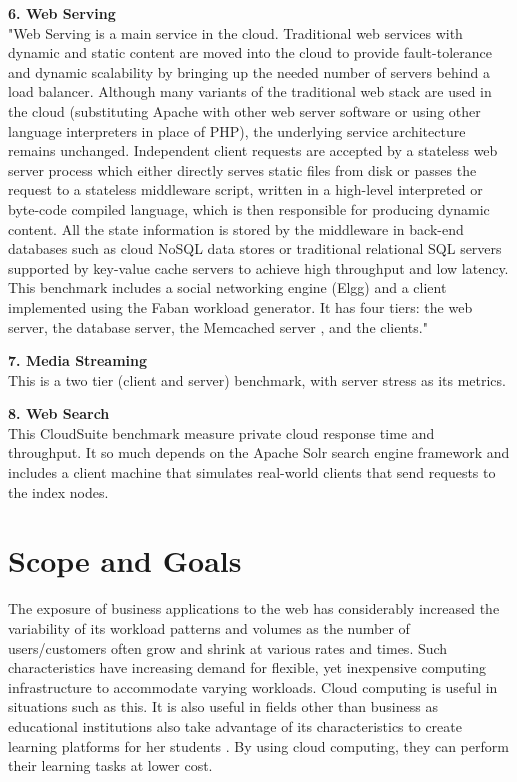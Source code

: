 \textbf{6. Web Serving} \\
"Web Serving is a main service in the cloud. Traditional web services with dynamic and static content are moved into the cloud to provide fault-tolerance and dynamic scalability by bringing up the needed number of servers behind a load balancer. Although many variants of the traditional web stack are used in the cloud (substituting Apache with other web server software or using other language interpreters in place of PHP), the underlying service architecture remains unchanged. Independent client requests are accepted by a stateless web server process which either directly serves static files from disk or passes the request to a stateless middleware script, written in a high-level interpreted or byte-code compiled language, which is then responsible for producing dynamic content. All the state information is stored by the middleware in back-end databases such as cloud NoSQL data stores or traditional relational SQL servers supported by key-value cache servers to achieve high throughput and low latency. This benchmark includes a social networking engine (Elgg) and a client implemented using the Faban workload generator. It has four tiers: the web server, the database server, the Memcached server \cite{memcached}, and the clients." \cite{CloudSuite_WebServing}

\textbf{7. Media Streaming} \\
This is a two tier (client and server) benchmark, with server stress as its metrics.

\textbf{8. Web Search}\\
This CloudSuite benchmark measure private cloud response time and throughput. It so much depends on the Apache Solr \cite{apachesoir2018} search engine framework and includes a client machine that simulates real-world clients that send requests to the index nodes.

\section{Scope and Goals}
The exposure of business applications to the web has considerably increased the variability of its workload patterns and volumes as the number of users/customers often grow and shrink at various rates and times. Such characteristics have increasing demand for flexible, yet inexpensive computing infrastructure to accommodate varying workloads. Cloud computing is useful in situations such as this. It is also useful in fields other than business as educational institutions also take advantage of its characteristics to create learning platforms for her students \cite{bora2013learning}. By using cloud computing, they can perform their learning tasks at lower cost.

